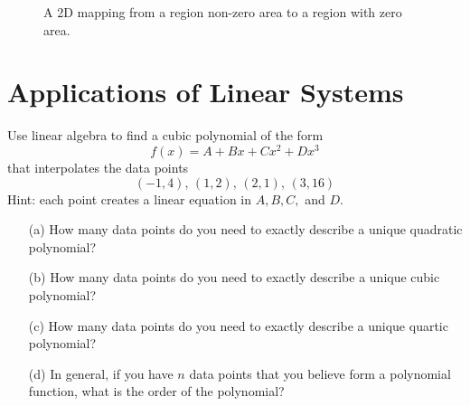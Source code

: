 \begin{figure}[ht!]
\begin{center}
    \end{center}
    \caption{A 2D mapping from a region non-zero area to a region with zero area.}
    \label{fig:determinant_vol_2}
\end{figure}


\newpage\section{Applications of Linear Systems}
% 
\begin{problem}
    Use linear algebra to find a cubic polynomial of the form 
    \[ f(x) = A + Bx + Cx^2 + Dx^3 \]
    that interpolates the data points
    \[ (-1,4), \, (1,2), \, (2,1), \, (3,16) \]
    Hint: each point creates a linear equation in $A, B, C,$ and $D$.  
\end{problem}

\begin{problem}
    \begin{enumerate}
        \item[(a)] How many data points do you need to exactly describe a unique quadratic
            polynomial?
        \item[(b)] How many data points do you need to exactly describe a unique cubic
            polynomial?
        \item[(c)] How many data points do you need to exactly describe a unique quartic
            polynomial?
        \item[(d)] In general, if you have $n$ data points that you believe form a
            polynomial function, what is the order of the polynomial?
    \end{enumerate}
\end{problem}


